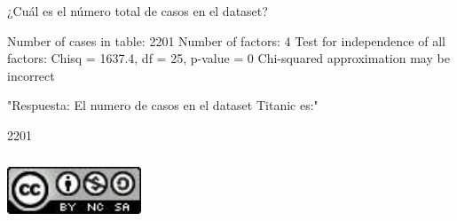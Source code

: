 \documentclass{report}
\begin{document}
\newpage

¿Cuál es el número total de casos en el dataset?

\begin{Schunk}
\begin{Soutput}
Number of cases in table: 2201 
Number of factors: 4 
Test for independence of all factors:
	Chisq = 1637.4, df = 25, p-value = 0
	Chi-squared approximation may be incorrect
\end{Soutput}
\begin{Soutput}
[1] "Respuesta: El numero de casos en el dataset Titanic es:"
\end{Soutput}
\begin{Soutput}
[1] 2201
\end{Soutput}
\end{Schunk}





\centering
\href{http://creativecommons.org/licenses/by-nc-sa/4.0/}{\includegraphics[width=4cm, height=2cm]{lic}}
\end{document}
